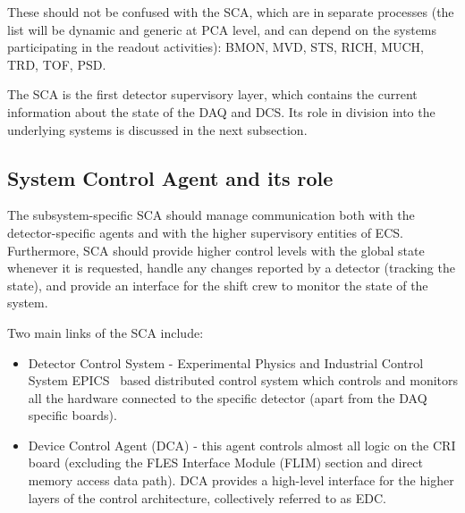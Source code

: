 These should not be confused with the \gls{SCA}, which are in separate processes (the list will be dynamic and generic at \gls{PCA} level, and can depend on the systems participating in the readout activities): \gls{BMON}, \gls{MVD}, \gls{STS}, \gls{RICH}, \gls{MUCH}, \gls{TRD}, \gls{TOF}, \gls{PSD}. 

The SCA is the first detector supervisory layer, which contains the current information about the state of the \gls{DAQ} and \gls{DCS}. Its role in division into the underlying systems is discussed in the next subsection.

\subsection{System Control Agent and its role}
The subsystem-specific \gls{SCA} should manage communication both with the detector-specific agents and with the higher supervisory entities of \gls{ECS}. Furthermore, \gls{SCA} should provide higher control levels with the global state whenever it is requested, handle any changes reported by a detector (tracking the state), and provide an interface for the shift crew to monitor the state of the system. 

Two main links of the \gls{SCA} include:
\begin{itemize}
    \item Detector Control System - Experimental Physics and Industrial Control System \gls{EPICS}~\cite{EPICS} based distributed control system which controls and monitors all the hardware connected to the specific detector (apart from the \gls{DAQ} specific boards).
    \item Device Control Agent (\gls{DCA}) - this agent controls almost all logic on the \gls{CRI} board (excluding the FLES Interface Module (\gls{FLIM}) section and direct memory access data path). \gls{DCA} provides a high-level interface for the higher layers of the control architecture, collectively referred to as \gls{EDC}. 
\end{itemize}










